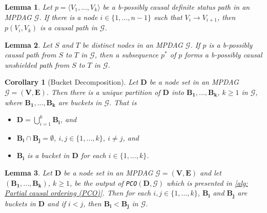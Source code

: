 \documentclass{article} %
\newtheorem{lemma}{Lemma}[section]
\newtheorem{corollary}{Corollary}[section]
\begin{document}
\begin{lemma}\citep[Lemma B.1]{perkovic2017interpreting} \label{lem: perkovic2017interpreting/Lemma_B.1}
    Let $p=\langle V_{1},..., V_{k}\rangle$ be a b-possibly causal definite status path in an MPDAG $\mathcal{G}$. If there is a node $i \in \{1,...,n-1\}$ such that $V_i \rightarrow V_{i+1}$, then $p(V_i, V_k)$ is a causal path in $\mathcal{G}$.
\end{lemma}

\begin{lemma}\citep[Lemma 3.6]{perkovic2017interpreting}
\label{lem: perkovic2017interpreting/Lemma_3.6}
    Let $S$ and $T$ be distinct nodes in an MPDAG $\mathcal{G}$. If $p$ is a b-possibly causal path from $S$ to $T$ in $\mathcal{G}$, then a subsequence $p^*$ of $p$ forms a b-possibly causal unshielded path from $S$ to $T$ in $\mathcal{G}$.
\end{lemma}

\begin{corollary}[Bucket Decomposition] \citep[Corollary 3.4]{perkovic2020identifying} \label{cor: bucket decomposition}
    Let $\mathbf{D}$ be a node set in an MPDAG $\mathcal{G}=(\mathbf{V}, \mathbf{E})$. Then there is a unique partition of $\mathbf{D}$ into $\mathbf{B_1},..., \mathbf{B_k}$, $k \ge 1$ in $\mathcal{G}$, where $\mathbf{B_1},..., \mathbf{B_k}$ are buckets in $\mathcal{G}$. That is
    \begin{itemize}
        \item $\mathbf{D}=\bigcup_{i=1}^{k} \mathbf{B_i}$, and
        \item $\mathbf{B_i} \cap \mathbf{B_j} = \emptyset$, $i,j \in \{1,...,k\}$, $i \ne j$, and
        \item $\mathbf{B_i}$ is a bucket in $\mathbf{D}$ for each $i \in \{1,...,k\}$.
    \end{itemize}
\end{corollary}

\begin{lemma} \citep[Lemma 3.5]{perkovic2020identifying}
    Let $\mathbf{D}$ be a node set in an MPDAG $\mathcal{G}=(\mathbf{V}, \mathbf{E})$ and let $(\mathbf{B_1},..., \mathbf{B_k})$, $k \geq 1$, be the output of \texttt{PCO}$(\mathbf{D}, \mathcal{G})$ which is presented in \cref{alg: Partial causal ordering (PCO)}. Then for each $i,j \in \{1,...,k\}$, $\mathbf{B_i}$ and $\mathbf{B_j}$ are buckets in $\mathbf{D}$ and if $i < j$, then $\mathbf{B_i} < \mathbf{B_j}$ in $\mathcal{G}$. 
\end{lemma}
\end{document}
